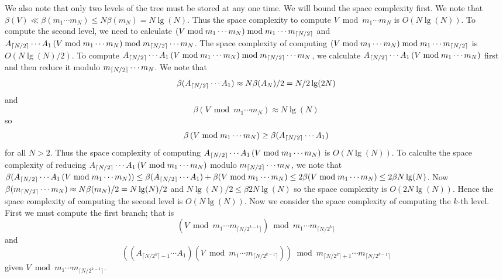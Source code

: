We also note that only two levels of the tree must be stored at any one time. We will bound the space complexity first. We note that $\beta(V)\ll\beta(m_{1}\cdots m_{N})\leq N\beta(m_N)=N\lg(N)$. Thus the space complexity to compute $V\bmod m_{1}\cdots m_{N}$ is $O(N\lg(N))$. To compute the second level, we need to calculate $\left(V \bmod m_{1}\cdots m_{N} \right)\bmod m_{1}\cdots m_{\lceil N/2\rceil}$ and $A_{\lceil N/2\rceil}\cdots A_1\left(V \bmod m_{1}\cdots m_{N} \right)\bmod m_{\lceil N/2\rceil}\cdots m_{N}$. The space complexity of computing $\left(V \bmod m_{1}\cdots m_{N} \right)\bmod m_{1}\cdots m_{\lceil N/2\rceil}$ is $O(N\lg(N)/2)$. To compute $A_{\lceil N/2\rceil}\cdots A_1\left(V \bmod m_{1}\cdots m_{N} \right)\bmod m_{\lceil N/2\rceil}\cdots m_{N}$, we calculate $A_{\lceil N/2\rceil}\cdots A_1\left(V \bmod m_{1}\cdots m_{N} \right)$ first and then reduce it modulo $m_{\lceil N/2\rceil}\cdots m_{N}$. We note that \[\beta(A_{\lceil N/2\rceil}\cdots A_1)\approx N \beta(A_N)/2=N/2\lg(2N)\] and \[\beta\left(V \bmod m_{1}\cdots m_{N}\right)\approx N\lg(N)\] so \[\beta\left(V \bmod m_{1}\cdots m_{N}\right)\geq \beta(A_{\lceil N/2\rceil}\cdots A_1) \] for all $N>2$. Thus the space complexity of computing $A_{\lceil N/2\rceil}\cdots A_1\left(V \bmod m_{1}\cdots m_{N} \right)$ is $O(N\lg(N))$. To calculte the space complexity of reducing $A_{\lceil N/2\rceil}\cdots A_1\left(V \bmod m_{1}\cdots m_{N} \right)$ modulo $m_{\lceil N/2\rceil}\cdots m_{N}$, we note that $\beta(A_{\lceil N/2\rceil}\cdots A_1\left(V \bmod m_{1}\cdots m_{N} \right))\leq \beta(A_{\lceil N/2\rceil}\cdots A_1)+\beta(V \bmod m_{1}\cdots m_{N})\leq 2\beta(V \bmod m_{1}\cdots m_{N})\leq 2\beta N\lg(N)$. Now $\beta(m_{\lceil N/2\rceil}\cdots m_{N})\approx N\beta(m_N)/2=N\lg(N)/2$ and 
$ N\lg(N)/2\leq \beta 2N\lg(N)$ so the space complexity is $O(2N\lg(N))$. Hence the space complexity of computing the second level is $O(N\lg(N))$.
 Now we consider the space complexity of computing the $k$-th level. First we must compute the first branch; that is \[ \left( V\bmod m_{1}\cdots m_{\lceil N/2^{k-1} \rceil}\right)\bmod m_{1}\cdots m_{\lceil N/2^{k}\rceil}\]  and  \[ \left( \left( A_{\lceil N/2^k \rceil-1} \cdots A_{1}\right) \left( V\bmod m_{1}\cdots m_{\lceil N/2^{k-1}\rceil}\right) \right) \bmod m_{\lceil N/2^{k}\rceil +1}\cdots m_{\lceil N/2^{k-1}\rceil}\] given $V\bmod m_{1}\cdots m_{\lceil N/2^{k-1}\rceil}$. 
